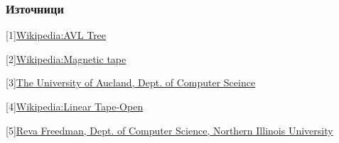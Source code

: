 \documentclass{beamer}
\begin{document}
\begin{frame}[t]
  \frametitle{Източници}
  
 [1]\href{https://en.wikipedia.org/wiki/AVL_tree}{Wikipedia:AVL Tree}
 
 [2]\href{https://en.wikipedia.org/wiki/Magnetic_tape}{Wikipedia:Magnetic tape}

 [3]\href{https://www.cs.auckland.ac.nz/historydisplays/FifthFloor/MagneticDataStorage/MagneticTapes.php}{The University of Aucland, Dept. of Computer Sceince}

 [4]\href{https://en.wikipedia.org/wiki/Linear_Tape-Open}{Wikipedia:Linear Tape-Open}

 [5]\href{https://faculty.cs.niu.edu/~freedman/340/340notes/340multi.htm}{Reva Freedman, Dept. of Computer Science, Northern Illinois University}
 
  \end{frame}
\end{document}
